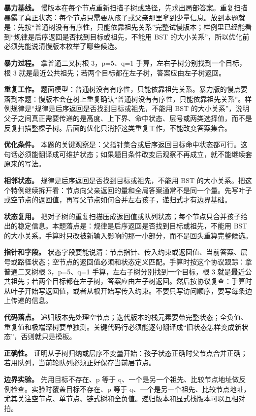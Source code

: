 \textbf{暴力基线。} 慢版本在每个节点重新扫描子树或路径，先求出局部答案。重复扫描暴露了真正状态：每个节点只需要从孩子或父亲那里拿到少量信息。放到本题就是：先按“普通树没有有序性，只能依靠祖先关系”完整试慢版本；样例里已经能看到“规律是后序返回是否找到目标或祖先，不能用 BST 的大小关系”，所以优化前必须先能说清慢版本枚举了哪些候选。

\textbf{暴力过程。} 拿普通二叉树根 3，p=5、q=1 手算，左右子树分别找到一个目标，根 3 就是最近公共祖先；若两个目标都在左子树，答案应由左子树返回。

\textbf{重复工作。} 题面模型：普通树没有有序性，只能依靠祖先关系。暴力版的慢点要落到本题：慢版本会在树上重复确认“普通树没有有序性，只能依靠祖先关系”。样例规律是“规律是后序返回是否找到目标或祖先，不能用 BST 的大小关系”，说明父子之间真正需要传递的是高度、上下界、命中状态、层号或两类选择值，而不是反复扫描整棵子树。后面的优化只消掉这类重复工作，不能改变答案集合。

\textbf{优化条件。} 本题的关键观察是：父指针集合或后序返回目标命中状态都可行。这句话必须能翻译成可维护状态；如果题目条件改变后观察不再成立，就不能继续套原来的写法。

\textbf{相邻状态。} 规律是后序返回是否找到目标或祖先，不能用 BST 的大小关系。把这个特例继续拆开看：节点向父亲返回的量和全局答案通常不是同一个量。先写叶子或空节点的返回值，再写父节点如何合并左右孩子，递归式才有边界基础。

\textbf{状态复用。} 把对子树的重复扫描压成返回值或队列状态；每个节点只合并孩子给出的稳定信息。本题落点是：规律是后序返回是否找到目标或祖先，不能用 BST 的大小关系。手算时只改被新输入影响的那一小部分，而不是回头重算完整候选。

\textbf{指针和字段。} 状态字段要能说清：节点指针、传入约束或返回值、当前答案、层号或路径状态；空节点的返回值必须和状态定义匹配。手算时按这个协议跟踪：拿普通二叉树根 3，p=5、q=1 手算，左右子树分别找到一个目标，根 3 就是最近公共祖先；若两个目标都在左子树，答案应由左子树返回。然后按协议复查：手算时从叶子开始写返回值，或者从根开始写传入约束。不要只写访问顺序，要写每条边上传递的信息。

\textbf{代码落点。} 递归版本先处理空节点；迭代版本的栈元素要带完整状态；全负值、重复值和极端深树要单独测。关键代码行必须能逐句翻译成“旧状态怎样变成新状态”，否则就只是模板。

\textbf{正确性。} 证明从子树归纳或层序不变量开始：孩子状态正确时父节点合并正确；若用队列，当前轮队列必须正好保存当前层节点。

\textbf{边界实验。} 先用目标不存在、p 等于 q、一个是另一个祖先、比较节点地址做反例检查。实验时覆盖目标不存在、p 等于 q、一个是另一个祖先、比较节点地址，尤其关注空节点、单节点、链式树和全负值。递归版本和显式栈版本可以互相对拍。

